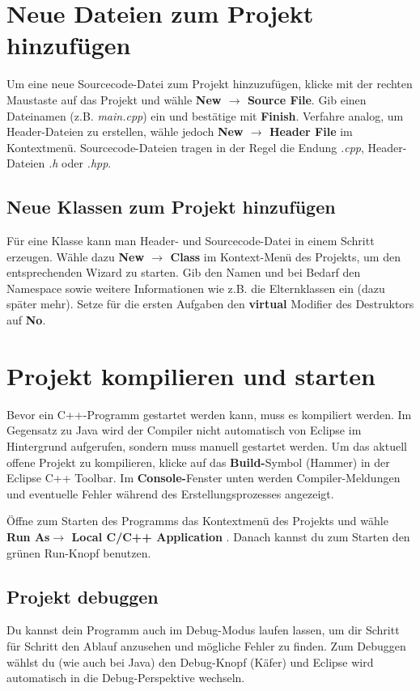 \documentclass[
  accentcolor=tud1c,	%
  colorbacktitle,		%
  inverttitle,			%
  german,
  twoside
]{tudreport}
\begin{document}
\section{Neue Dateien zum Projekt hinzufügen}
Um eine neue Sourcecode-Datei zum Projekt hinzuzufügen, klicke mit der rechten Maustaste auf das Projekt und wähle \textbf{New $\rightarrow$ Source File}.
Gib einen Dateinamen (z.B. \emph{main.cpp}) ein und bestätige mit \textbf{Finish}. 
Verfahre analog, um Header-Dateien zu erstellen, wähle jedoch \textbf{New $\rightarrow$ Header File} im Kontextmenü.
Sourcecode-Dateien tragen in der Regel die Endung \emph{.cpp}, Header-Dateien \emph{.h} oder \emph{.hpp}.

\subsection{Neue Klassen zum Projekt hinzufügen}
Für eine Klasse kann man Header- und Sourcecode-Datei in einem Schritt erzeugen.
Wähle dazu \textbf{New $\rightarrow$ Class} im Kontext-Menü des Projekts, um den entsprechenden Wizard zu starten.
Gib den Namen und bei Bedarf den Namespace sowie weitere Informationen wie z.B. die Elternklassen ein (dazu später mehr).
Setze für die ersten Aufgaben den \textbf{virtual} Modifier des Destruktors auf \textbf{No}.


\section{Projekt kompilieren und starten}
Bevor ein C++-Programm gestartet werden kann, muss es kompiliert werden.
Im Gegensatz zu Java wird der Compiler nicht automatisch von Eclipse im Hintergrund aufgerufen, sondern muss manuell gestartet werden.
Um das aktuell offene Projekt zu kompilieren, klicke auf das \textbf{Build-}Symbol (\glqq Hammer\grqq) in der Eclipse C++ Toolbar.
Im \textbf{Console-}Fenster unten werden Compiler-Meldungen und eventuelle Fehler während des Erstellungsprozesses angezeigt.

Öffne zum Starten des Programms das Kontextmenü des Projekts und wähle \textbf{Run As$\rightarrow$ Local C/C++ Application }.
Danach kannst du zum Starten den grünen Run-Knopf benutzen.

\subsection{Projekt debuggen}
Du kannst dein Programm auch im Debug-Modus laufen lassen, um dir Schritt für Schritt den Ablauf anzusehen und mögliche Fehler zu finden.
Zum Debuggen wählst du (wie auch bei Java) den Debug-Knopf (\glqq Käfer\grqq) und Eclipse wird automatisch in die Debug-Perspektive wechseln.
\end{document}
